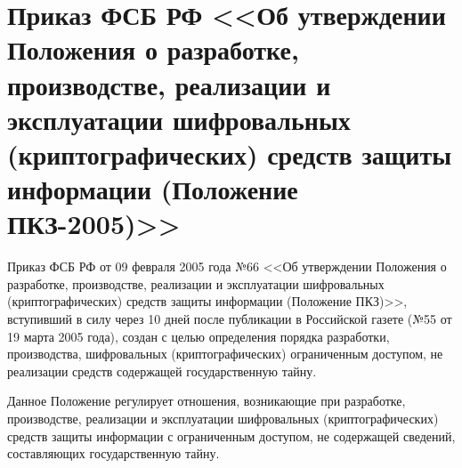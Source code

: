 \section{Приказ ФСБ РФ <<Об утверждении Положения о разработке, производстве, реализации и эксплуатации шифровальных (криптографических) средств защиты информации (Положение ПКЗ-2005)>>} \label{rights_fsb_66}

Приказ ФСБ РФ от 09 февраля 2005 года №66 <<Об утверждении Положения о разработке, производстве, реализации и эксплуатации шифровальных (криптографических) средств защиты информации (Положение ПКЗ)>>, вступивший в силу через 10 дней после публикации в Российской газете (№55 от 19 марта 2005 года), создан с целью определения порядка разработки, производства, шифровальных (криптографических) ограниченным доступом, не реализации средств содержащей государственную тайну.

\vspace{\baselineskip}
Данное Положение регулирует отношения, возникающие при разработке, производстве, реализации и эксплуатации шифровальных (криптографических) средств защиты информации с ограниченным доступом, не содержащей сведений, составляющих государственную тайну.

